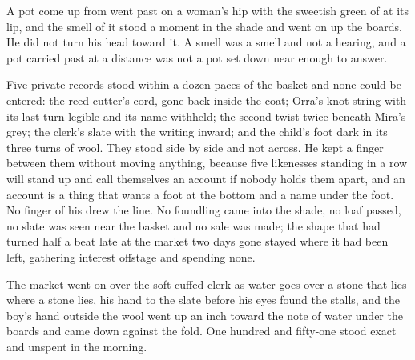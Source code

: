 A pot come up from  went past on a woman's hip with the sweetish green of  at its lip, and the smell of it stood a moment in the shade and went on up the boards. He did not turn his head toward it. A smell was a smell and not a hearing, and a pot carried past at a distance was not a pot set down near enough to answer.

Five private records stood within a dozen paces of the basket and none could be entered: the reed-cutter's cord, gone back inside the coat; Orra's knot-string with its last turn legible and its name withheld; the second twist twice beneath Mira's grey; the clerk's slate with the writing inward; and the child's foot dark in its three turns of wool. They stood side by side and not across. He kept a finger between them without moving anything, because five likenesses standing in a row will stand up and call themselves an account if nobody holds them apart, and an account is a thing that wants a foot at the bottom and a name under the foot. No finger of his drew the line. No foundling came into the shade, no loaf passed, no slate was seen near the basket and no sale was made; the shape that had turned half a beat late at the market two days gone stayed where it had been left, gathering interest offstage and spending none.

The market went on over the soft-cuffed clerk as water goes over a stone that lies where a stone lies, his hand to the slate before his eyes found the stalls, and the boy's hand outside the wool went up an inch toward the note of water under the boards and came down against the fold. One hundred and fifty-one stood exact and unspent in the morning.
